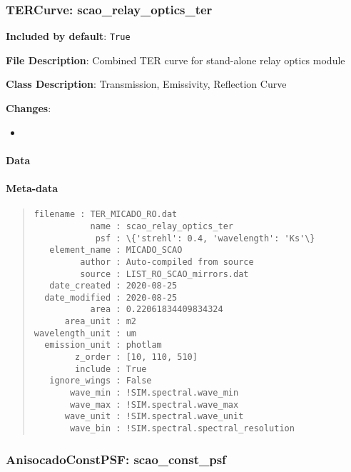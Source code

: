 \subsubsection{TERCurve: \textquotedbl{}scao\_relay\_optics\_ter\textquotedbl{}%
  \label{tercurve-scao-relay-optics-ter}%
}

\textbf{Included by default}: \texttt{True}

\textbf{File Description}: Combined TER curve for stand-alone relay optics module

\textbf{Class Description}: Transmission, Emissivity, Reflection Curve

\textbf{Changes}:

\begin{itemize}
\item \end{itemize}


\paragraph{Data%
  \label{data}%
}


\paragraph{Meta-data%
  \label{meta-data}%
}

\begin{quote}
\begin{alltt}
\begin{lstlisting}[frame=single]
       filename : TER_MICADO_RO.dat
           name : scao_relay_optics_ter
            psf : \{'strehl': 0.4, 'wavelength': 'Ks'\}
   element_name : MICADO_SCAO
         author : Auto-compiled from source
         source : LIST_RO_SCAO_mirrors.dat
   date_created : 2020-08-25
  date_modified : 2020-08-25
           area : 0.22061834409834324
      area_unit : m2
wavelength_unit : um
  emission_unit : photlam
        z_order : [10, 110, 510]
        include : True
   ignore_wings : False
       wave_min : !SIM.spectral.wave_min
       wave_max : !SIM.spectral.wave_max
      wave_unit : !SIM.spectral.wave_unit
       wave_bin : !SIM.spectral.spectral_resolution
\end{lstlisting}
\end{alltt}
\end{quote}


\subsubsection{AnisocadoConstPSF: \textquotedbl{}scao\_const\_psf\textquotedbl{}%
  \label{anisocadoconstpsf-scao-const-psf}%
}

